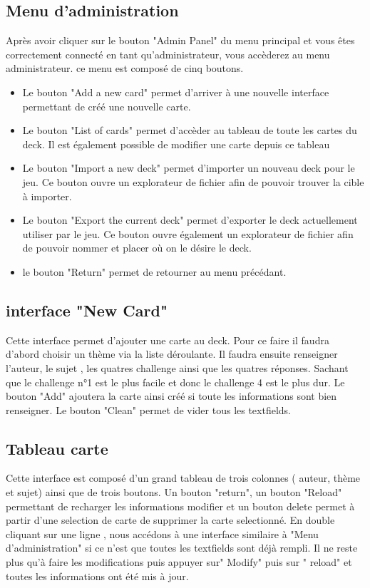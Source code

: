 \subsection{Menu d'administration}
Après avoir cliquer sur le bouton "Admin Panel" du menu principal et vous êtes correctement connecté en tant 
qu'administrateur, vous accèderez au menu administrateur. ce menu est composé de cinq boutons.
\begin{itemize}
	\item Le bouton "Add a new card" permet d'arriver à une nouvelle interface permettant de créé une nouvelle carte.
	\item Le bouton "List of cards" permet d'accèder au tableau de toute les cartes du deck. Il est également possible de modifier une carte depuis ce tableau
	\item Le bouton "Import a new deck" permet d'importer un nouveau deck pour le jeu. Ce bouton ouvre un explorateur de fichier afin de pouvoir trouver la cible à importer.
	\item Le bouton "Export the current deck" permet d'exporter le deck actuellement utiliser par le jeu. Ce bouton ouvre également un explorateur de fichier afin de pouvoir nommer et placer où on le désire le deck.
	\item le bouton "Return" permet de retourner au menu précédant.
\end{itemize}

\subsection{interface "New Card"}
Cette interface permet d'ajouter une carte au deck. Pour ce faire il faudra d'abord choisir un thème via la 
liste déroulante. Il faudra ensuite renseigner l'auteur, le sujet , les quatres challenge ainsi que les 
quatres réponses. Sachant que le challenge n°1 est le plus facile et donc le challenge 4 est le plus dur.
Le bouton "Add" ajoutera la carte ainsi créé si toute les informations sont bien renseigner. Le bouton "Clean" permet de vider tous les textfields.

\subsection{Tableau carte}
Cette interface est composé d'un grand tableau de trois colonnes ( auteur, thème et sujet) ainsi que de trois 
boutons. Un bouton "return", un bouton "Reload" permettant de recharger les informations modifier et un bouton 
delete permet à partir d'une selection de carte de supprimer la carte selectionné. En double cliquant sur une 
ligne , nous accédons à une interface similaire à "Menu d'administration" si ce n'est que toutes les 
textfields sont déjà rempli. Il ne reste plus qu'à faire les modifications puis appuyer sur" Modify" puis sur "
reload" et toutes les informations ont été mis à jour.
